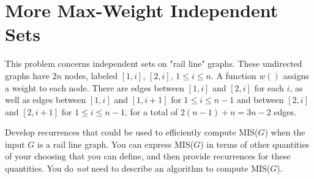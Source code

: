 \documentclass[11pt]{article}
\def\question#1{\red{#1}}
\def\red#1{{\color{red}#1}}
\begin{document}
\section{More Max-Weight Independent Sets}
\label{sec-5}
This problem concerns independent sets on "rail line" graphs. These
undirected graphs have $2n$ nodes, labeled $[1,i]$, $[2,i]$, $1 \le i
\le n$. A function $w()$ assigns a weight to each node. There are
edges between $[1,i]$ and $[2,i]$ for each $i$, as well as edges
between $[1,i]$ and $[1,i+1]$ for $1 \le i \le n-1$ and between
$[2,i]$ and $[2,i+1]$ for $1 \le i \le n-1$, for a total of $2(n-1) +
n = 3n-2$ edges.

\question{Develop recurrences that could be used to efficiently compute MIS($G$) when the input $G$ is a rail line graph.} You
can express MIS($G$) in terms of other quantities of your
choosing that you can define, and then provide recurrences for these quantities.
You do \emph{not} need to describe an algorithm to compute MIS($G$).
\end{document}
